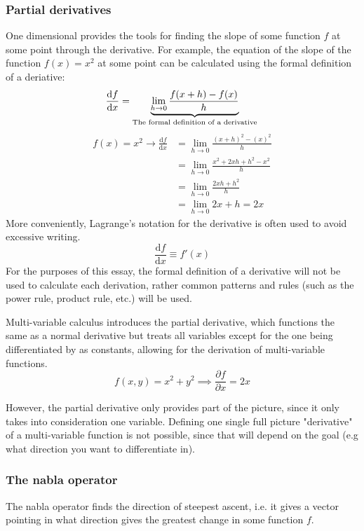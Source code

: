 \documentclass[a4paper, 12pt]{article} %
\newcommand{\der}[2]{\frac{\mathrm{d} #1}{\mathrm{d} #2}} %
\newcommand{\partialder}[2]{\frac{\partial #1}{\partial #2}} %
\begin{document}
\subsubsection{Partial derivatives}
One dimensional provides the tools for finding the slope of some function $f$ at some point through the derivative. For example, the equation of the slope of the function $f(x)=x^2$ at some point can be calculated using the formal definition of a deriative:
\begin{equation}
	\der{f}{x}=\underbrace{\lim_{h\rightarrow0}\frac{f(x+h)-f(x)}{h}}_\text{The formal definition of a derivative}\\
\end{equation}
\begin{align*}
	f(x)=x^2\rightarrow\der{f}{x}&=\lim_{h\rightarrow0}\frac{(x+h)^2-(x)^2}{h}\\
	&=\lim_{h\rightarrow0}\frac{x^2+2xh+h^2-x^2}{h}\\
	&=\lim_{h\rightarrow0}\frac{2xh+h^2}{h}\\
	&=\lim_{h\rightarrow0}2x+h=2x
\end{align*}
More conveniently, Lagrange's notation for the derivative is often used to avoid excessive writing.
$$\der{f}{x}\equiv f'(x)$$
For the purposes of this essay, the formal definition of a derivative will not be used to calculate each derivation, rather common patterns and rules (such as the power rule, product rule, etc.) will be used. 

Multi-variable calculus introduces the partial derivative, which functions the same as a normal derivative but treats all variables except for the one being differentiated by as constants, allowing for the derivation of multi-variable functions.
$$f(x,y)=x^2+y^2\implies\partialder{f}{x}=2x$$

However, the partial derivative only provides part of the picture, since it only takes into consideration one variable. Defining one single full picture "derivative" of a multi-variable function is not possible, since that will depend on the goal (e.g what direction you want to differentiate in).

\subsubsection{The nabla operator}
The nabla operator finds the direction of steepest ascent, i.e. it gives a vector pointing in what direction gives the greatest change in some function $f$.
\end{document}
